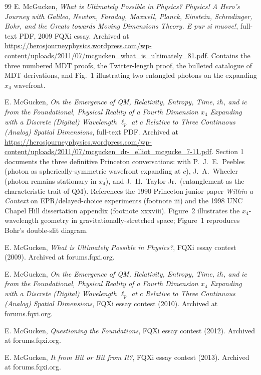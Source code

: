 \documentclass[11pt,a4paper]{article}
\begin{document}
\begin{thebibliography}{99}
 E. McGucken, \emph{What is Ultimately Possible in Physics? Physics! A Hero's Journey with Galileo, Newton, Faraday, Maxwell, Planck, Einstein, Schrodinger, Bohr, and the Greats towards Moving Dimensions Theory. E pur si muove!}, full-text PDF, 2009 FQXi essay. Archived at \url{https://herosjourneyphysics.wordpress.com/wp-content/uploads/2011/07/mcgucken_what_is_ultimately_81.pdf}. Contains the three numbered MDT proofs, the Twitter-length proof, the bulleted catalogue of MDT derivations, and Fig.~1 illustrating two entangled photons on the expanding $x_4$ wavefront.

 E. McGucken, \emph{On the Emergence of QM, Relativity, Entropy, Time, $i\hbar$, and $ic$ from the Foundational, Physical Reality of a Fourth Dimension $x_4$ Expanding with a Discrete (Digital) Wavelength $\ell_p$ at $c$ Relative to Three Continuous (Analog) Spatial Dimensions}, full-text PDF. Archived at \url{https://herosjourneyphysics.wordpress.com/wp-content/uploads/2011/07/mcgucken_dr-_elliot_mcgucke_7-11.pdf}. Section 1 documents the three definitive Princeton conversations: with P.\ J.\ E.\ Peebles (photon as spherically-symmetric wavefront expanding at $c$), J.\ A.\ Wheeler (photon remains stationary in $x_4$), and J.\ H.\ Taylor Jr.\ (entanglement as the characteristic trait of QM). References the 1990 Princeton junior paper \emph{Within a Context} on EPR/delayed-choice experiments (footnote iii) and the 1998 UNC Chapel Hill dissertation appendix (footnote xxxviii). Figure~2 illustrates the $x_4$-wavelength geometry in gravitationally-stretched space; Figure~1 reproduces Bohr's double-slit diagram.

 E. McGucken, \emph{What is Ultimately Possible in Physics?}, FQXi essay contest (2009). Archived at forums.fqxi.org.

 E. McGucken, \emph{On the Emergence of QM, Relativity, Entropy, Time, $i\hbar$, and $ic$ from the Foundational, Physical Reality of a Fourth Dimension $x_4$ Expanding with a Discrete (Digital) Wavelength $\ell_p$ at $c$ Relative to Three Continuous (Analog) Spatial Dimensions}, FQXi essay contest (2010). Archived at forums.fqxi.org.

 E. McGucken, \emph{Questioning the Foundations}, FQXi essay contest (2012). Archived at forums.fqxi.org.

 E. McGucken, \emph{It from Bit or Bit from It?}, FQXi essay contest (2013). Archived at forums.fqxi.org.


\end{thebibliography}
\end{document}
